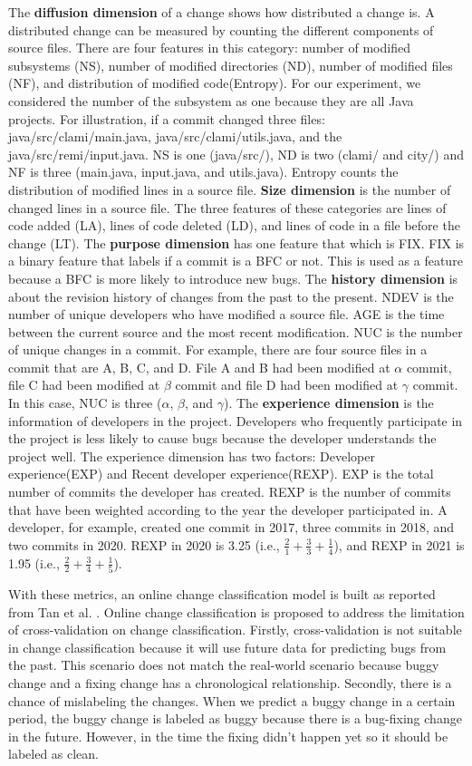 The \textbf{diffusion dimension} of a change shows how distributed a change is.
A distributed change can be measured by counting the different components of source files.
There are four features in this category: number of modified subsystems (NS), number of modified directories (ND), number of modified files (NF), and distribution of modified code(Entropy).
For our experiment, we considered the number of the subsystem as one because they are all Java projects.
For illustration, if a commit changed three files: java/src/clami/main.java, java/src/clami/utils.java, and the java/src/remi/input.java.
NS is one (java/src/), ND is two (clami/ and city/) and NF is three (main.java, input.java, and utils.java).
Entropy counts the distribution of modified lines in a source file.
\textbf{Size dimension} is the number of changed lines in a source file.
The three features of these categories are lines of code added (LA), lines of code deleted (LD), and lines of code in a file before the change (LT).
The \textbf{purpose dimension} has one feature that which is FIX.
FIX is a binary feature that labels if a commit is a BFC or not.
This is used as a feature because a BFC is more likely to introduce new bugs.
The \textbf{history dimension} is about the revision history of changes from the past to the present.
NDEV is the number of unique developers who have modified a source file.
AGE is the time between the current source and the most recent modification.
NUC is the number of unique changes in a commit.
For example, there are four source files in a commit that are A, B, C, and D. File A and B had been modified at $\alpha$ commit, file C had been modified at $\beta$ commit and file D had been modified at $\gamma$ commit.
In this case, NUC is three ($\alpha$, $\beta$, and $\gamma$). 
The \textbf{experience dimension} is the information of developers in the project.
Developers who frequently participate in the project is less likely to cause bugs because the developer understands the project well.
The experience dimension has two factors: Developer experience(EXP) and Recent developer experience(REXP).
EXP is the total number of commits the developer has created.
REXP is the number of commits that have been weighted according to the year the developer participated in.
A developer, for example, created one commit in 2017, three commits in 2018, and two commits in 2020.
REXP in 2020 is 3.25 (i.e., $\frac{2}{1} + \frac{3}{3}  + \frac{1}{4}$), and REXP in 2021 is 1.95 (i.e., $\frac{2}{2} + \frac{3}{4}  + \frac{1}{5}$).

With these metrics, an online change classification model is built as reported from Tan et al. \cite{tan2015online}.
Online change classification is proposed to address the limitation of cross-validation on change classification.
Firstly, cross-validation is not suitable in change classification because it will use future data for predicting bugs from the past.
This scenario does not match the real-world scenario because buggy change and a fixing change has a chronological relationship.
Secondly, there is a chance of mislabeling the changes. 
When we predict a buggy change in a certain period, the buggy change is labeled as buggy because there is a bug-fixing change in the future.
However, in the time the fixing didn't happen yet so it should be labeled as clean.

